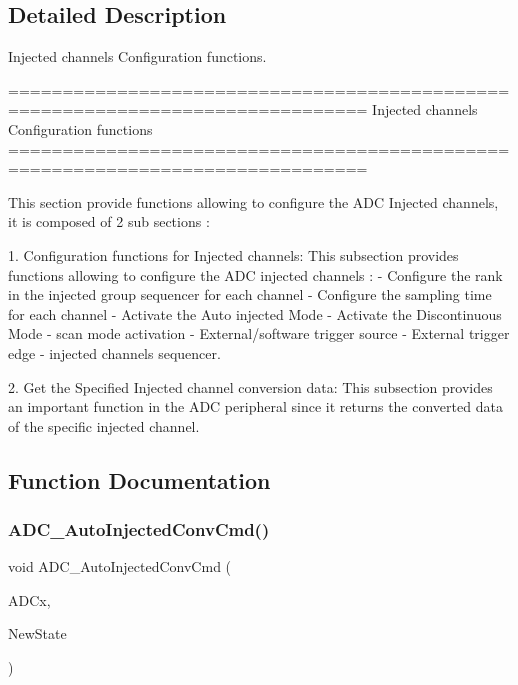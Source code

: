 \subsection{Detailed Description}
Injected channels Configuration functions. 

\begin{DoxyVerb} ===============================================================================
                     Injected channels Configuration functions
 ===============================================================================  

  This section provide functions allowing to configure the ADC Injected channels,
  it is composed of 2 sub sections : 
    
  1. Configuration functions for Injected channels: This subsection provides 
     functions allowing to configure the ADC injected channels :    
    - Configure the rank in the injected group sequencer for each channel
    - Configure the sampling time for each channel    
    - Activate the Auto injected Mode  
    - Activate the Discontinuous Mode 
    - scan mode activation  
    - External/software trigger source   
    - External trigger edge 
    - injected channels sequencer.
    
   2. Get the Specified Injected channel conversion data: This subsection 
      provides an important function in the ADC peripheral since it returns the 
      converted data of the specific injected channel.\end{DoxyVerb}
 

\subsection{Function Documentation}
\mbox{\label{group__ADC__Group6_ga1ff9c3b8e4bbdd2addfd227f1a506a66}} 
\subsubsection{A\+D\+C\+\_\+\+Auto\+Injected\+Conv\+Cmd()}
{\footnotesize\ttfamily void A\+D\+C\+\_\+\+Auto\+Injected\+Conv\+Cmd (\begin{DoxyParamCaption}\item[{\textbf{ A\+D\+C\+\_\+\+Type\+Def} $\ast$}]{A\+D\+Cx,  }\item[{\textbf{ Functional\+State}}]{New\+State }\end{DoxyParamCaption})}



